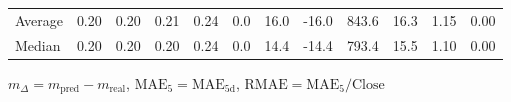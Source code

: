 \begin{threeparttable}
{\begin{tabular}{lrrrrrrrrrrr}
Average &          0.20 &          0.20 &          0.21 &        0.24 &                 0.0 &                16.0 &      -16.0 &               843.6 &             16.3 &            1.15 &                   0.00 \\
 Median &          0.20 &          0.20 &          0.20 &        0.24 &                 0.0 &                14.4 &      -14.4 &               793.4 &             15.5 &            1.10 &                   0.00 \\
\bottomrule
\end{tabular}
}
\begin{tablenotes}\footnotesize
\item $m_\Delta=m_{\text{pred}}-m_{\text{real}}$,
$\mathrm{MAE}_5=\mathrm{MAE}_{5\text{d}}$,
$\mathrm{RMAE}=\mathrm{MAE}_5/\text{Close}$
\end{tablenotes}
\end{threeparttable}
\endgroup

